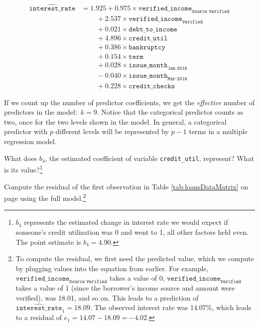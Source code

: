 \documentclass[
  10pt,
  openany]{book}
\theoremstyle{definition}
\theoremstyle{definition}
\theoremstyle{definition}
\theoremstyle{definition}
\theoremstyle{remark}
\begin{document}
\begin{align*}
\widehat{\texttt{interest_rate}}
    &= 1.925 +
        0.975 \times \texttt{verified_income}_{\texttt{Source Verified}} \\
    &\qquad\  +
        2.537 \times \texttt{verified_income}_{\texttt{Verified}} \\
    &\qquad\  +
        0.021 \times \texttt{debt_to_income} \\
    &\qquad\  +
        4.896 \times \texttt{credit_util} \\
    &\qquad\  +
        0.386 \times \texttt{bankruptcy} \\
    &\qquad\  +
        0.154 \times \texttt{term} \\
    &\qquad\  +
        0.028 \times \texttt{issue_month}_{\texttt{Jan-2018}} \\
    &\qquad\  -
        0.040 \times \texttt{issue_month}_{\texttt{Mar-2018}} \\
    &\qquad\  +
        0.228 \times \texttt{credit_checks}
\end{align*}

If we count up the number of predictor coefficients, we get the \emph{effective} number of predictors in the model:~\(k = 9\).
Notice that the categorical predictor counts as two, once for the two levels shown in the model.
In general, a categorical predictor with \(p\) different levels will be represented by \(p - 1\) terms in a multiple regression model.

What does \(b_4\), the estimated coefficient of variable \texttt{credit\_util}, represent?
What is its value?\footnote{\(b_4\) represents the estimated change in interest rate we
  would expect if someone's credit utilization was 0 and went to 1,
  all other factors held even. The point estimate is \(b_4 = 4.90%
  \).}

Compute the residual of the first observation in Table \ref{tab:loansDataMatrix} on page using the full model.\footnote{To compute the residual, we first need the predicted value, which we compute by plugging values into the equation from earlier. For example,
  \(\texttt{verified_income}_{\texttt{Source Verified}}\) takes a value of 0, \(\texttt{verified_income}_{\texttt{Verified}}\) takes a value of 1 (since the borrower's income source and amount were verified), was 18.01, and so on.
  This leads to a prediction of \(\widehat{\texttt{interest_rate}}_1 = 18.09\).
  The observed interest rate was 14.07\%, which leads to a residual of \(e_1 = 14.07 - 18.09 = -4.02\).}
\end{document}
